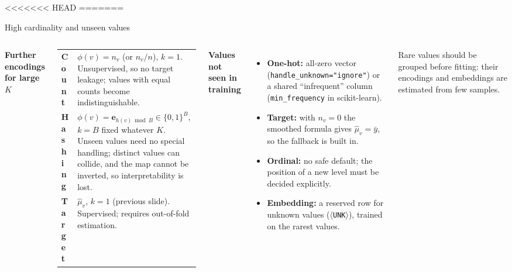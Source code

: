 <<<<<<< HEAD
=======
\begin{frame}{High cardinality and unseen values}
\begingroup\small
\begin{columns}[T]
\textbf{\color{courseblue} Further encodings for large $K$}
\vspace{0.3em}

\begingroup\footnotesize
\renewcommand{\arraystretch}{1.35}
\begin{tabularx}{\linewidth}{>{\bfseries}l >{\raggedright\arraybackslash}X}
Count & $\phi(v) = n_v$ (or $n_v/n$), $k = 1$. Unsupervised, so no target leakage; values with equal counts become indistinguishable. \\
Hashing & $\phi(v) = \mathbf{e}_{h(v) \bmod B} \in \{0,1\}^{B}$, $k = B$ fixed whatever $K$. Unseen values need no special handling; distinct values can collide, and the map cannot be inverted, so interpretability is lost. \\
Target & $\hat{\mu}_v$, $k = 1$ (previous slide). Supervised; requires out-of-fold estimation. \\
\end{tabularx}
\par\endgroup

\textbf{\color{courseblue} Values not seen in training}
\vspace{0.3em}

\begingroup\footnotesize
\begin{itemize}\setlength{\itemsep}{3pt}
\item \textbf{One-hot:} all-zero vector (\texttt{handle\_unknown="ignore"}) or a shared ``infrequent'' column (\texttt{min\_frequency} in scikit-learn).
\item \textbf{Target:} with $n_v = 0$ the smoothed formula gives $\hat{\mu}_v = \bar{y}$, so the fallback is built in.
\item \textbf{Ordinal:} no safe default; the position of a new level must be decided explicitly.
\item \textbf{Embedding:} a reserved row for unknown values ($\langle$\texttt{UNK}$\rangle$), trained on the rarest values.
\end{itemize}
\vspace{0.2em}
Rare values should be grouped before fitting: their encodings and embeddings are estimated from few samples.
\par\endgroup
\end{columns}
\par\endgroup
\coursefooter
\end{frame}

